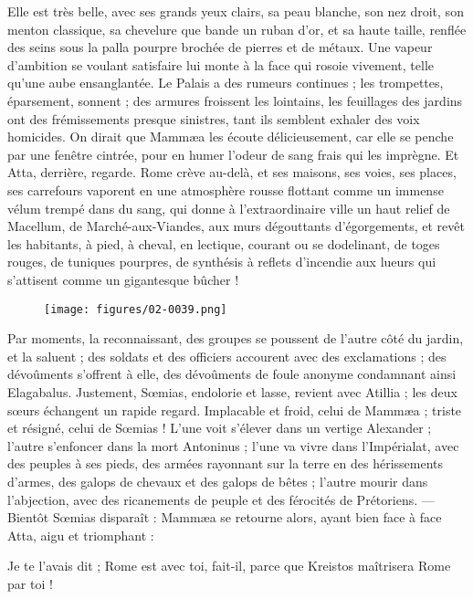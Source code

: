 \documentclass[a4paper, 11pt, oneside, polutonikogreek, french]{article}
\begin{document}
Elle est très belle, avec ses grands yeux clairs, sa peau blanche, son nez droit, son menton classique, sa chevelure que bande un ruban d'or, et sa haute taille, renflée des seins sous la palla pourpre brochée de pierres et de métaux. Une vapeur d'ambition se voulant satisfaire lui monte à la face qui rosoie vivement, telle qu'une aube ensanglantée. Le Palais a des rumeurs continues ; les trompettes, éparsement, sonnent ; des armures froissent les lointains, les feuillages des jardins ont des frémissements presque sinistres, tant ils semblent exhaler des voix homicides. On dirait que Mammæa les écoute délicieusement, car elle se penche par une fenêtre cintrée, pour en humer l'odeur de sang frais qui les imprègne. Et Atta, derrière, regarde. Rome crève au-delà, et ses maisons, ses voies, ses places, ses carrefours vaporent en une atmosphère rousse flottant comme un immense vélum trempé dans du sang, qui donne à l'extraordinaire ville un haut relief de Macellum, de Marché-aux-Viandes, aux murs dégouttants d'égorgements, et revêt les habitants, à pied, à cheval, en lectique, courant ou se dodelinant, de toges rouges, de tuniques pourpres, de synthésis à reflets d'incendie aux lueurs qui s'attisent comme un gigantesque bûcher !
\begin{figure}[H]
\centering
\texttt{[image: figures/02-0039.png]}
\end{figure}
Par moments, la reconnaissant, des groupes se poussent de l'autre côté du jardin, et la saluent ; des soldats et des officiers accourent avec des exclamations ; des dévoûments s'offrent à elle, des dévoûments de foule anonyme condamnant ainsi Elagabalus. Justement, Sœmias, endolorie et lasse, revient avec Atillia ; les deux sœurs échangent un rapide regard. Implacable et froid, celui de Mammæa ; triste et résigné, celui de Sœmias ! L'une voit s'élever dans un vertige Alexander ; l'autre s'enfoncer dans la mort Antoninus ; l'une va vivre dans l'Impérialat, avec des peuples à ses pieds, des armées rayonnant sur la terre en des hérissements d'armes, des galops de chevaux et des galops de bêtes ; l'autre mourir dans l'abjection, avec des ricanements de peuple et des férocités de Prétoriens. --- Bientôt Sœmias disparaît : Mammæa se retourne alors, ayant bien face à face Atta, aigu et triomphant :

Je te l'avais dit ; Rome est avec toi, fait-il, parce que Kreistos maîtrisera Rome par toi !
\clearpage
\subsection{}
\end{document}
